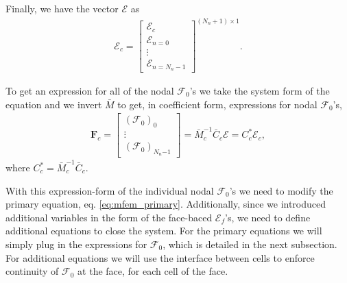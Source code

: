 \documentclass[10pt,letterpaper,notitlepage]{article}
\numberwithin{equation}{section}
\newcommand{\RadE}{\mathcal{E}}
\newcommand{\RadF}{\boldsymbol{\mathcal{F}}}
\newcommand{\RadJ}{\RadF_0}
\newcommand{\beqn}{\begin{equation}\begin{aligned}}
\newcommand{\eeqn}{\end{aligned}\end{equation}}
\begin{document}
Finally, we have the vector $\boldsymbol{\RadE}$ as
\beqn 
\boldsymbol{\RadE}_c = 
\begin{bmatrix}
	\RadE_c \\
	\RadE_{n=0} \\
	\vdots \\
	\RadE_{n=N_n-1}
\end{bmatrix}^{(N_n+1){\times}1}.
\eeqn 

To get an expression for all of the nodal $\RadJ$'s we take the system form of the equation and we invert $\bar{M}$ to get, in coefficient form, expressions for nodal $\RadJ$'s,
\beqn 
\mathbf{F}_c =
\begin{bmatrix}
	(\RadJ)_0 \\ \vdots \\ (\RadJ)_{N_n{-1}}
\end{bmatrix}
 = \bar{M}_c^{-1} \bar{C}_c \boldsymbol{\RadE}
 = C_c^* \boldsymbol{\RadE}_c,
\eeqn 
where $C_c^* = \bar{M}_c^{-1} \bar{C}_c$. 

With this expression-form of the individual nodal $\RadJ$'s we need to modify the primary equation, eq. \eqref{eq:mfem_primary}. Additionally, since we introduced additional variables in the form of the face-baced $\RadE_f$'s,  we need to define additional equations to close the system. For the primary equations we will simply plug in the expressions for $\RadJ$, which is detailed in the next subsection. For additional equations we will use the interface between cells to enforce continuity of $\RadJ$ at the face, for each cell of the face.
\end{document}
